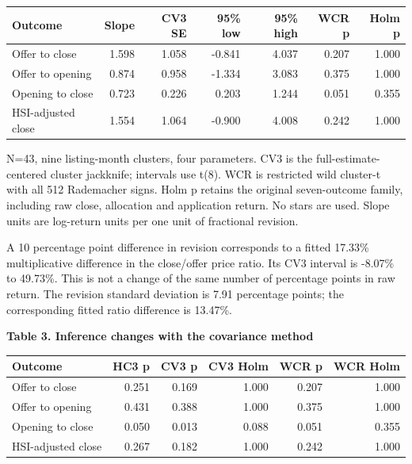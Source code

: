 \documentclass[10pt,a4paper]{article}
\begin{document}
{\small\renewcommand{\arraystretch}{1.10}\begin{tabularx}{\textwidth}{@{}Xrrrrrr@{}}\toprule

\textbf{Outcome} & \textbf{Slope} & \textbf{CV3 SE} & \textbf{95\% low} & \textbf{95\% high} & \textbf{WCR p} & \textbf{Holm p} \\\midrule

Offer to close & 1.598 & 1.058 & -0.841 & 4.037 & 0.207 & 1.000 \\

Offer to opening & 0.874 & 0.958 & -1.334 & 3.083 & 0.375 & 1.000 \\

Opening to close & 0.723 & 0.226 & 0.203 & 1.244 & 0.051 & 0.355 \\

HSI-adjusted close & 1.554 & 1.064 & -0.900 & 4.008 & 0.242 & 1.000 \\

\bottomrule\end{tabularx}}\par

{\footnotesize N=43, nine listing-month clusters, four parameters. CV3 is the full-estimate-centered cluster jackknife; intervals use t(8). WCR is restricted wild cluster-t with all 512 Rademacher signs. Holm p retains the original seven-outcome family, including raw close, allocation and application return. No stars are used. Slope units are log-return units per one unit of fractional revision.}\par

A 10 percentage point difference in revision corresponds to a fitted 17.33\% multiplicative difference in the close/offer price ratio. Its CV3 interval is -8.07\% to 49.73\%. This is not a change of the same number of percentage points in raw return. The revision standard deviation is 7.91 percentage points; the corresponding fitted ratio difference is 13.47\%.

\par\addvspace{5pt}\textbf{Table 3. Inference changes with the covariance method}\par\nobreak\vspace{2pt}

{\small\renewcommand{\arraystretch}{1.10}\begin{tabularx}{\textwidth}{@{}Xrrrrr@{}}\toprule

\textbf{Outcome} & \textbf{HC3 p} & \textbf{CV3 p} & \textbf{CV3 Holm} & \textbf{WCR p} & \textbf{WCR Holm} \\\midrule

Offer to close & 0.251 & 0.169 & 1.000 & 0.207 & 1.000 \\

Offer to opening & 0.431 & 0.388 & 1.000 & 0.375 & 1.000 \\

Opening to close & 0.050 & 0.013 & 0.088 & 0.051 & 0.355 \\

HSI-adjusted close & 0.267 & 0.182 & 1.000 & 0.242 & 1.000 \\

\bottomrule\end{tabularx}}\par
\end{document}
